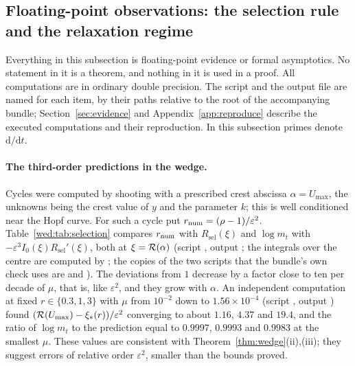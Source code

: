 \subsection{Floating-point observations: the selection rule and the relaxation regime}\label{wed:sec:relax}
Everything in this subsection is floating-point evidence or formal asymptotics. No statement in it is a theorem, and nothing in it is used in a proof. All computations are in ordinary double precision. The script and the output file are named for each item, by their paths relative to the root of the accompanying bundle; Section~\ref{sec:evidence} and Appendix~\ref{app:reproduce} describe the executed computations and their reproduction. In this subsection primes denote $\mathrm d/\mathrm dt$.

\paragraph{The third-order predictions in the wedge.}
Cycles were computed by shooting with a prescribed crest abscissa $\alpha=U_{\max}$, the unknowns being the crest value of $y$ and the parameter $k$; this is well conditioned near the Hopf curve. For such a cycle put $r_{\rm num}=(\rho-1)/\varepsilon^2$. Table~\ref{wed:tab:selection} compares $r_{\rm num}$ with $R_{\mathrm{sel}}(\xi)$ and $\log m_t$ with $-\varepsilon^3I_0(\xi)R_{\mathrm{sel}}'(\xi)$, both at $\xi=\mathcal R(\alpha)$ (script , output ; the integrals over the centre are computed by ; the copies of the two scripts that the bundle's own check  uses are  and ). The deviations from $1$ decrease by a factor close to ten per decade of $\mu$, that is, like $\varepsilon^2$, and they grow with $\alpha$. An independent computation at fixed $r\in\{0.3,1,3\}$ with $\mu$ from $10^{-2}$ down to $1.56\times10^{-4}$ (script , output ) found $(\mathcal R(U_{\max})-\xi_*(r))/\varepsilon^2$ converging to about $1.16$, $4.37$ and $19.4$, and the ratio of $\log m_t$ to the prediction equal to $0.9997$, $0.9993$ and $0.9983$ at the smallest $\mu$. These values are consistent with Theorem~\ref{thm:wedge}(ii),(iii); they suggest errors of relative order $\varepsilon^2$, smaller than the bounds proved.

